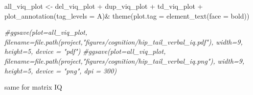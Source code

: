 \documentclass[
]{article}
\newenvironment{Shaded}{\begin{snugshade}}{\end{snugshade}}
\newcommand{\AttributeTok}[1]{\textcolor[rgb]{0.77,0.63,0.00}{#1}}
\newcommand{\CommentTok}[1]{\textcolor[rgb]{0.56,0.35,0.01}{\textit{#1}}}
\newcommand{\FunctionTok}[1]{\textcolor[rgb]{0.00,0.00,0.00}{#1}}
\newcommand{\NormalTok}[1]{#1}
\newcommand{\OtherTok}[1]{\textcolor[rgb]{0.56,0.35,0.01}{#1}}
\newcommand{\SpecialCharTok}[1]{\textcolor[rgb]{0.00,0.00,0.00}{#1}}
\newcommand{\StringTok}[1]{\textcolor[rgb]{0.31,0.60,0.02}{#1}}
\begin{document}
\begin{Shaded}
\begin{Highlighting}[]
\NormalTok{all\_viq\_plot }\OtherTok{\textless{}{-}}\NormalTok{ del\_viq\_plot }\SpecialCharTok{+}\NormalTok{ dup\_viq\_plot }\SpecialCharTok{+}\NormalTok{ td\_viq\_plot }\SpecialCharTok{+} \FunctionTok{plot\_annotation}\NormalTok{(}\AttributeTok{tag\_levels =} \StringTok{\textquotesingle{}A\textquotesingle{}}\NormalTok{)}\SpecialCharTok{\&} \FunctionTok{theme}\NormalTok{(}\AttributeTok{plot.tag =} \FunctionTok{element\_text}\NormalTok{(}\AttributeTok{face =} \StringTok{\textquotesingle{}bold\textquotesingle{}}\NormalTok{))}

\CommentTok{\#ggsave(plot=all\_viq\_plot, filename=file.path(project,"figures/cognition/hip\_tail\_verbal\_iq.pdf"), width=9, height=5, device = "pdf")}
\CommentTok{\#ggsave(plot=all\_viq\_plot, filename=file.path(project,"figures/cognition/hip\_tail\_verbal\_iq.png"), width=9, height=5, device = "png", dpi = 300)}
\end{Highlighting}
\end{Shaded}

same for matrix IQ
\end{document}
